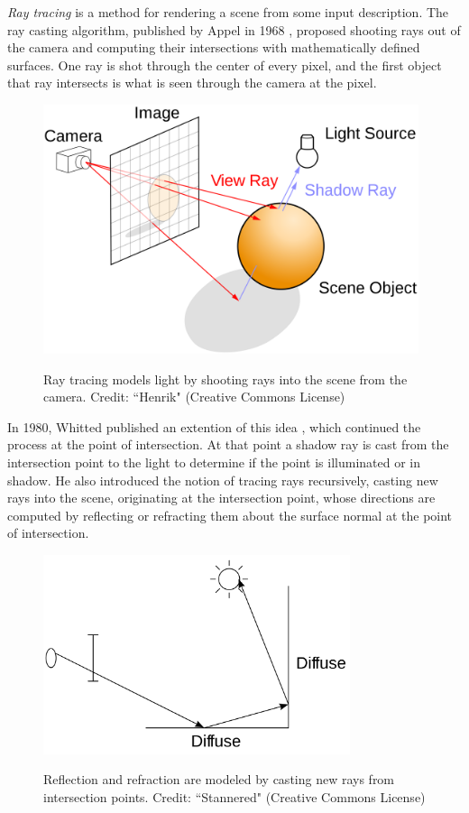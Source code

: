 \documentclass[12pt]{ucthesis}
\newcommand{\captionfonts}{\small\bf\ssp}
\begin{document}
\emph{Ray tracing} is a method for rendering a scene from some input description.
The ray casting algorithm, published by Appel in 1968 \cite{appel:1968}, proposed
shooting rays out of the camera and computing their intersections with mathematically
defined surfaces. One ray is shot through the center of every pixel, and the first
object that ray intersects is what is seen through the camera at the pixel.

\begin{figure}[h!]
    \centering
    \includegraphics[width=110mm]{figures/raytracing.png}
    \captionfonts
    \caption{Ray tracing models light by shooting rays into the scene from the camera. Credit: ``Henrik" (Creative Commons License)}
    \label{fig:raytracing}
\end{figure}

In 1980, Whitted published an extention of this idea \cite{whitted:1980},
which continued the process at the point of intersection. At that point a shadow
ray is cast from the intersection point to the light to determine if the
point is illuminated or in shadow. He also introduced the notion of tracing
rays recursively, casting new rays into the scene, originating at the intersection
point, whose directions are computed by reflecting or refracting them about the
surface normal at the point of intersection.

\begin{figure}[h!]
    \centering
    \includegraphics[width=90mm]{figures/reflectionrefraction.png}
    \captionfonts
    \caption{Reflection and refraction are modeled by casting new rays from intersection points. Credit: ``Stannered" (Creative Commons License)}
    \label{fig:reflectrefract}
\end{figure}
\end{document}
